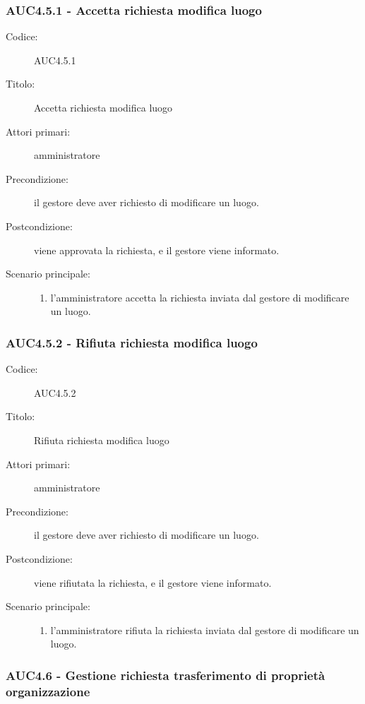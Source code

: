 \documentclass[casi-duso]{subfiles}
\begin{document}
\subsubsection{AUC4.5.1 - Accetta richiesta modifica luogo}%
\label{subsub:AUC4.5.1}
\begin{description}
  \item[Codice:] AUC4.5.1
  \item[Titolo:] Accetta richiesta modifica luogo
  \item[Attori primari:] amministratore
  \item[Precondizione:] il gestore deve aver richiesto di modificare un luogo.
  \item[Postcondizione:] viene approvata la richiesta, e il gestore viene informato.
  \item[Scenario principale:]
  \begin{enumerate}
    \item  l'amministratore accetta la richiesta inviata dal gestore di modificare un luogo.
  \end{enumerate}
\end{description}

\subsubsection{AUC4.5.2 - Rifiuta richiesta modifica luogo}%
\label{subsub:AUC4.5.2}
\begin{description}
  \item[Codice:] AUC4.5.2
  \item[Titolo:] Rifiuta richiesta modifica luogo
  \item[Attori primari:] amministratore
  \item[Precondizione:] il gestore deve aver richiesto di modificare un luogo.
  \item[Postcondizione:] viene rifiutata la richiesta, e il gestore viene informato.
  \item[Scenario principale:]
  \begin{enumerate}
    \item l'amministratore rifiuta la richiesta inviata dal gestore di modificare un luogo.
  \end{enumerate}
\end{description}

\subsubsection{AUC4.6 - Gestione richiesta trasferimento di proprietà organizzazione}%
\label{subsub:AUC4.6}
\end{document}
